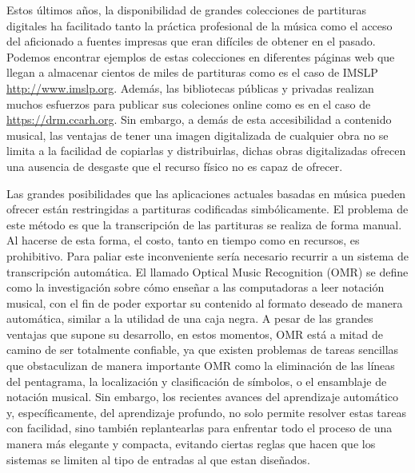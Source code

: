 \documentclass{article}
\begin{document}
Estos últimos años, la disponibilidad de grandes colecciones de partituras digitales ha facilitado tanto la práctica
profesional de la música como el acceso del aficionado a fuentes impresas que eran difíciles de obtener en el pasado.
Podemos encontrar ejemplos de estas colecciones en diferentes páginas web que llegan a almacenar cientos de miles de partituras
como es el caso de IMSLP \url{http://www.imslp.org}. Además, las bibliotecas públicas y privadas realizan muchos esfuerzos para publicar sus coleciones
online como es en el caso de \url{https://drm.ccarh.org}. Sin embargo, a demás de esta accesibilidad a contenido musical, las
ventajas de tener una imagen digitalizada de cualquier obra no se limita a la facilidad de copiarlas y distribuirlas, dichas obras 
digitalizadas ofrecen una ausencia de desgaste que el recurso físico no es capaz de ofrecer.

Las grandes posibilidades que las aplicaciones actuales basadas en música pueden ofrecer están restringidas a partituras codificadas
simbólicamente.
El problema de este método es que la transcripción de las partituras se realiza de forma manual.
Al hacerse de esta forma, el costo, tanto en tiempo como en recursos, es prohibitivo. Para paliar este inconveniente sería necesario recurrir a un sistema
 de transcripción automática. El llamado Optical Music Recognition (OMR) se define como la investigación sobre cómo enseñar a las
computadoras a leer notación musical, con el fin de poder exportar su contenido al formato deseado de manera automática, similar a la
utilidad de una caja negra. A pesar de las grandes ventajas que supone su desarrollo, en estos momentos, OMR está a mitad de camino de
ser totalmente confiable, ya que existen problemas de tareas sencillas que obstaculizan de manera importante OMR como la eliminación de
las líneas del pentagrama, la localización y clasificación de símbolos, o el ensamblaje de notación musical. Sin embargo, los recientes
avances del aprendizaje automático y, específicamente, del aprendizaje profundo, no solo permite resolver estas tareas con facilidad,
sino también replantearlas para enfrentar todo el proceso de una manera más elegante y compacta, evitando ciertas reglas que hacen que los
sistemas se limiten al tipo de entradas al que estan diseñados.
\end{document}
